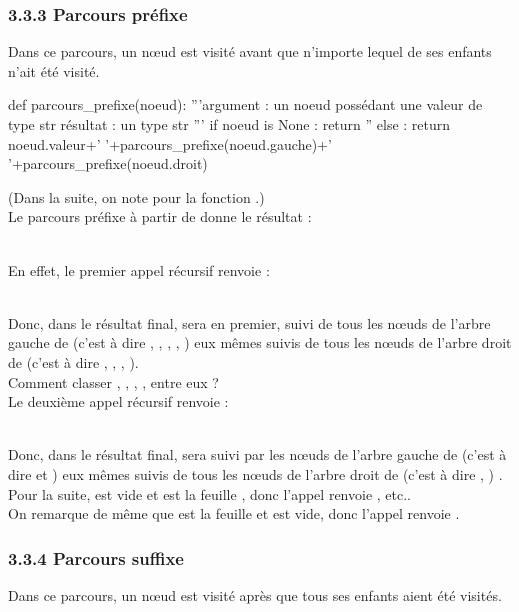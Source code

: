 \documentclass[11pt,a4paper,french,twoside]{PMCours}
\begin{document}
\subsubsection*{3.3.3 Parcours préfixe}
Dans ce parcours, un nœud est visité avant que n'importe lequel de ses enfants n'ait été visité.  
\begin{Python}
def parcours_prefixe(noeud):
	'''argument  : un noeud possédant une valeur de type str 
	résultat : un type str '''  
	if noeud is None :
		return ''
	else :
		return noeud.valeur+' '+parcours_prefixe(noeud.gauche)+' '+parcours_prefixe(noeud.droit)
\end{Python} 
(Dans la suite, on note  pour la fonction  .)\\
Le parcours préfixe à partir de  donne le résultat :\\
\centerline{} \\
En effet, le premier appel récursif renvoie :\\
\centerline{}\\
Donc, dans le résultat final,  sera en premier, suivi de tous les nœuds de l'arbre gauche de  (c'est à dire , , , , ) eux mêmes suivis de tous les nœuds de l'arbre droit de  (c'est à dire , , , ).\\
Comment classer , , , ,  entre eux ? \\
Le deuxième appel récursif renvoie :\\
\centerline{}\\
Donc, dans le résultat final,  sera suivi par les nœuds de l'arbre gauche de  (c'est à dire  et ) eux mêmes suivis de tous les nœuds de l'arbre droit de  (c'est à dire , ) .\\
Pour la suite,  est vide et  est la feuille , donc l'appel  renvoie , etc..\\
On remarque de même que  est la feuille  et  est vide, donc l'appel  renvoie .

\subsubsection*{3.3.4 Parcours suffixe}
Dans ce parcours, un nœud est visité après que tous ses enfants aient été visités.  
\end{document}
